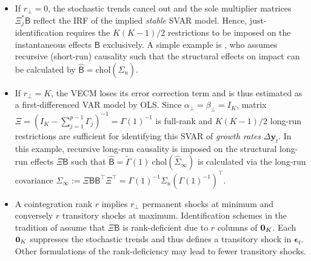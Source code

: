 \begin{itemize}
	\item If $ r_\perp = 0 $, the stochastic trends cancel out and the sole multiplier matrices $ \Xi_j^* \mathsf{B} $ reflect the IRF of the implied \textit{stable} SVAR model. Hence, just-identification requires the $ K(K-1)/2 $ restrictions to be imposed on the instantaneous effects $\mathsf{B} $ exclusively. A simple example is \citet{Sims1980}, who assumes recursive (short-run) causality such that the structural effects on impact can be calculated by $ \widehat{\mathsf{B}} = \text{chol} \left( \widehat{\Sigma}_{u} \right) $.
	
	\item If $ r_\perp = K $, the VECM loses its error correction term and is thus estimated as a first-differenced VAR model by OLS. Since $ \alpha_\perp = \beta_\perp = I_K $, matrix $ \Xi = \left(I_K - \sum_{j=1}^{p-1} \Gamma_{j} \right)^{-1} = \Gamma(1)^{-1} $ is full-rank and $ K(K-1)/2 $ long-run restrictions are sufficient for identifying this SVAR of \textit{growth rates} $ \Delta \boldsymbol{y}_{t} $. In this example, recursive long-run causality is imposed on the structural long-run effects $ \Xi \mathsf{B} $ such that $ \widehat{\mathsf{B}} = \widetilde{\Gamma}(1) \ \text{chol}\left( \widehat{\Sigma}_{\infty} \right) $ is calculated via the long-run covariance $ \Sigma_\infty := \Xi \mathsf{B} \mathsf{B}^\top\Xi^\top = \Gamma(1)^{-1} \Sigma_u \left( \Gamma(1)^{-1} \right)^\top$. 
	
	\item A cointegration rank $ r $ implies $ r_\perp $ permanent shocks at minimum and conversely $ r $ transitory shocks at maximum. Identification schemes in the tradition of \citet{KingEtAl1991} assume that $ \Xi \mathsf{B} $ is rank-deficient due to $ r $ columns of $ {\bf 0}_K $. Each $ {\bf 0}_K $ suppresses the stochastic trends and thus defines a transitory shock in $ \boldsymbol{\epsilon}_{t} $. Other formulations of the rank-deficiency may lead to fewer transitory shocks.
\end{itemize} 


